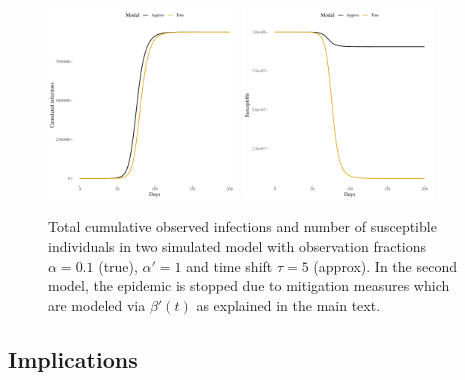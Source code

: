 \documentclass[fullpage,a4paper]{article}
\begin{document}
\begin{figure}
  \includegraphics[width=0.45\textwidth]{../figs/approx_infect.pdf}
  \includegraphics[width=0.45\textwidth]{../figs/approx_suscept.pdf}
  \caption{\label{fig:SIRapprox} Total cumulative observed infections
    and number of susceptible individuals in two simulated model with
    observation fractions $\alpha = 0.1$ (true), $\alpha' = 1$ and
    time shift $\tau = 5$ (approx). In the second model, the epidemic
    is stopped due to mitigation measures which are modeled via
    $\beta'(t)$ as explained in the main text.}
\end{figure}

\subsection{Implications}
\end{document}
